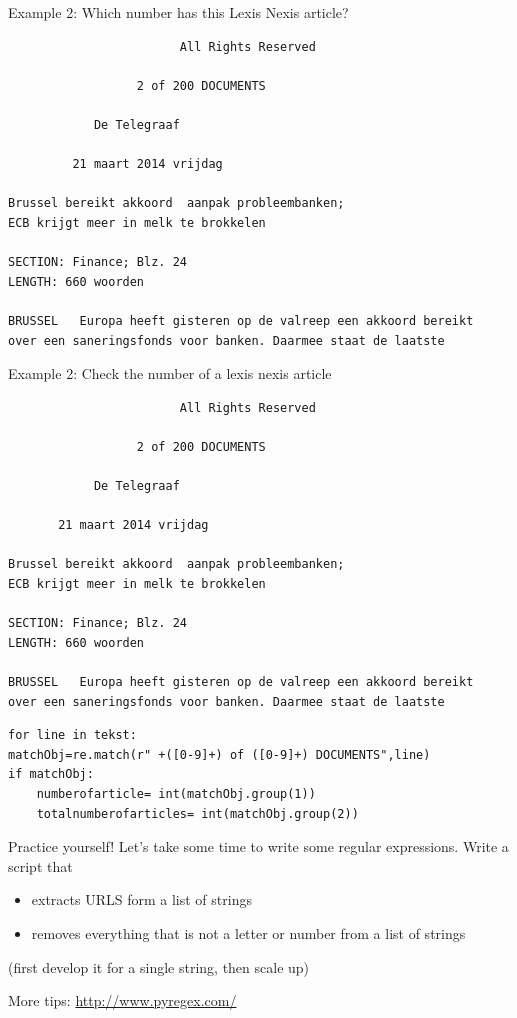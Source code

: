 \documentclass[compress]{beamer}
\begin{document}
\begin{frame}[fragile]{Example 2: Which number has this Lexis Nexis article?}
\begin{lstlisting}
                        All Rights Reserved

                  2 of 200 DOCUMENTS

            De Telegraaf

         21 maart 2014 vrijdag

Brussel bereikt akkoord  aanpak probleembanken;
ECB krijgt meer in melk te brokkelen

SECTION: Finance; Blz. 24
LENGTH: 660 woorden

BRUSSEL   Europa heeft gisteren op de valreep een akkoord bereikt 
over een saneringsfonds voor banken. Daarmee staat de laatste
\end{lstlisting}

\end{frame}

\begin{frame}[fragile]{Example 2: Check the number of a lexis nexis article}
\begin{lstlisting}
                        All Rights Reserved

                  2 of 200 DOCUMENTS

            De Telegraaf

       21 maart 2014 vrijdag

Brussel bereikt akkoord  aanpak probleembanken;
ECB krijgt meer in melk te brokkelen

SECTION: Finance; Blz. 24
LENGTH: 660 woorden

BRUSSEL   Europa heeft gisteren op de valreep een akkoord bereikt 
over een saneringsfonds voor banken. Daarmee staat de laatste
\end{lstlisting}

\begin{lstlisting}
for line in tekst:
matchObj=re.match(r" +([0-9]+) of ([0-9]+) DOCUMENTS",line)
if matchObj:
    numberofarticle= int(matchObj.group(1))
    totalnumberofarticles= int(matchObj.group(2))
\end{lstlisting}
\end{frame}


\begin{frame}{Practice yourself!}
Let's take some time to write some regular expressions.
Write a script that
\begin{itemize}
\item extracts URLS form a list of strings
\item removes everything that is not a letter or number from a list of strings
\end{itemize}
(first develop it for a single string, then scale up)

More tips:
\huge{\url{http://www.pyregex.com/}}
\end{frame}



\end{document}
